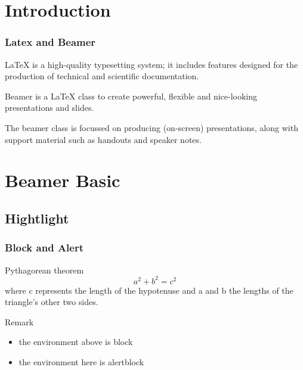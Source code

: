 \frame[plain]{\titlepage}

\section{Introduction}

\begin{frame}
    \frametitle{Latex and Beamer}
    
    LaTeX is a high-quality typesetting system; 
    it includes features designed for the production of 
    technical and scientific documentation.

    \vspace{0.4cm}

    \pause

    Beamer is a LaTeX class to create powerful, 
    flexible and nice-looking presentations and slides. 
    
    The beamer class is focussed on producing (on-screen) presentations, 
    along with support material such as handouts and speaker notes.
    
\end{frame}

\section{Beamer Basic}
\subsection{Hightlight}

\begin{frame}
    \frametitle{Block and Alert}

    \begin{block}{Pythagorean theorem}
        \vspace*{-\baselineskip}\setlength\belowdisplayshortskip{0.6pt}
        $$a^2 + b^2 = c^2$$
        where c represents the length of the hypotenuse and 
        a and b the lengths of the triangle's other two sides.
    \end{block}
    
    \begin{alertblock}{Remark}
        \begin{itemize}
            \item the environment above is \alert{block}
            \item the environment here is \alert{alertblock}
        \end{itemize}
    \end{alertblock}

\end{frame}


